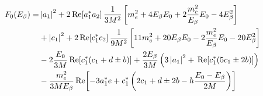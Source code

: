 %
%
%
\begin{align}
F_0(E_{\beta}) = &
\left| a_1 \right|^2 
+ 2 \,\mathrm{Re}\!\left[ a_1^* a_2 \right] \frac{1}{3 M^2} 
\left[  
	m_e^2 + 4 E_{\beta} E_0 + 2 \frac{m_e^2}{E_{\beta}}E_0 - 4E_{\beta}^2
\right]
\nonumber \\ &
+ \left| c_1 \right|^2
+ 2 \,\mathrm{Re}\!\left[ c_1^* c_2\right] \frac{1}{9 M^2} 
\left[
	11 m_e^2 + 20 E_{\beta} E_0 
	- 2\frac{m_e^2}{E_{\beta}}E_0
	- 20E_{\beta}^2
\right]
\nonumber \\ &
- 2 \frac{E_0}{3M} \,\mathrm{Re}\!\left[ c_1^*(c_1 + d \pm b)\right] + \frac{2E_{\beta}}{3M} 
\left( 
	3 \left| a_1 \right|^2 + \,\mathrm{Re}\! \left[ c_1^*(5c_1 \pm 2 b) \right]
\right)
\nonumber \\ &
- \frac{m_e^2}{3 M E_{\beta}} 
\,\mathrm{Re}\! \left[ 
	-3 a_1^*e + c_1^*\left(2c_1 + d \pm 2b - h\frac{E_0 - E_{\beta}}{2M} \right)
\right]
\end{align}
%